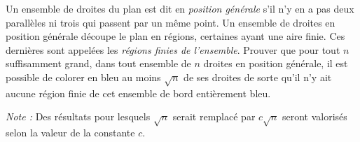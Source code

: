 Un ensemble de droites du plan est dit en \emph{position générale} s'il n'y en a pas deux parallèles ni trois
qui passent par un même point. Un ensemble de droites en position générale découpe le plan en régions,
certaines ayant une aire finie. Ces dernières sont appelées les \emph{régions finies de l'ensemble}. Prouver
que pour tout $n$ suffisamment grand, dans tout ensemble de $n$ droites en position générale, il est possible
de colorer en bleu au moins $\sqrt{n}$ de ses droites de sorte qu'il n'y ait aucune région finie de cet
ensemble de bord entièrement bleu.

\emph{Note :} Des résultats pour lesquels $\sqrt{n}$ serait remplacé par $c\sqrt{n}$ seront valorisés selon la
valeur de la constante $c$.
